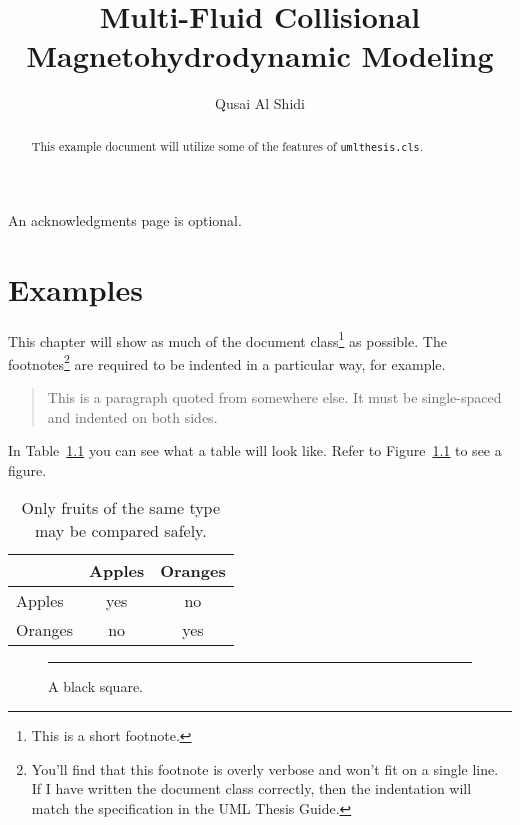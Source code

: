 \documentclass{umlthesis}
\title{Multi-Fluid Collisional Magnetohydrodynamic Modeling}
\author{Qusai Al Shidi}
\begin{document}
\begin{abstract}
  This example document will utilize some of the features of \texttt{umlthesis.cls}.
\end{abstract}

\begin{acknowledgments}
An acknowledgments page is optional.
\end{acknowledgments}

\tableofcontents
\listoffigures
\listoftables

\chapter{Examples}
This chapter will show as much of the document class\footnote{This is a short footnote.} as possible. The footnotes\footnote{You'll find that this footnote is overly verbose and won't fit on a single line. If I have written the document class correctly, then the indentation will match the specification in the UML Thesis Guide.} are required to be indented in a particular way, for example.

\begin{quote}
  This is a paragraph quoted from somewhere else. It must be single-spaced and indented on both sides.
\end{quote}

In Table~\ref{tab:fruits} you can see what a table will look like. Refer to Figure~\ref{fig:square} to see a figure.

\begin{table}[h]\label{tab:fruits}
  \centering
  \caption[Comparison of fruits]{Only fruits of the same type may be compared safely.}
  \begin{tabular}{l|cc}
    & Apples & Oranges \\
    \hline
    Apples & yes & no \\
    Oranges & no & yes \\
  \end{tabular}
\end{table}

\lipsum[1]

\begin{figure}\label{fig:square}
  \centering
  \rule{2in}{2in}
  \caption{A black square.}
\end{figure}
\end{document}
